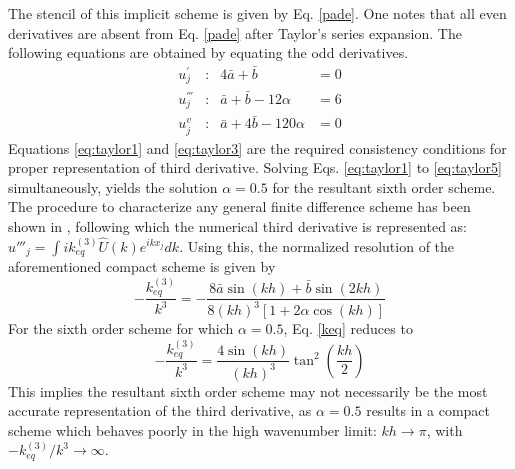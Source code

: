 The stencil of this implicit scheme is given by Eq. \eqref{pade}. One notes that all even derivatives are absent from Eq. \eqref{pade} after Taylor's series expansion. The following equations are obtained by 
equating the odd derivatives.
\begin{align}
\label{eq:taylor1}
u_{j}^{'}   &:&  4\bar{a} + \bar{b}&=0 \\
\label{eq:taylor3}
u_{j}^{'''} &:  & \bar{a} + \bar{b} - 12\alpha&=6\\
\label{eq:taylor5}
u_{j}^{v}   &:   &\bar{a} +4\bar{b} -120\alpha&=0
\end{align}
Equations \eqref{eq:taylor1} and \eqref{eq:taylor3} are the required consistency conditions for proper representation of third derivative. Solving Eqs. \eqref{eq:taylor1} to \eqref{eq:taylor5} simultaneously, yields the solution $\alpha = 0.5$ for the resultant sixth order scheme. The procedure to characterize any general finite difference scheme has been shown in \cite{Sengupta2003b}, following which the numerical third derivative is represented as: $u'''_j = \int ik_{eq}^{(3)}\hat{U}(k)e^{ikx_j}dk$. Using this, the normalized resolution of the aforementioned compact scheme is given by
\begin{equation}
\label{keq}
- \frac{k_{eq}^{(3)}}{k^3} = - \frac{8\bar{a} \sin(kh)+\bar{b}\sin(2kh)}{8(kh)^3[1+2\alpha\cos(kh)]}
\end{equation}
For the sixth order scheme for which $\alpha = 0.5$, Eq. \eqref{keq} reduces to
\begin{equation}
\label{keq1}
- \frac{k_{eq}^{(3)}}{k^3} = \frac{4\sin(kh)}{(kh)^3} \tan^2\left(\dfrac{kh}{2}\right)
\end{equation}
This implies the resultant sixth order scheme may not necessarily be the most accurate representation of the third derivative, as $\alpha = 0.5$ results in a compact scheme which behaves poorly in the high wavenumber limit: $kh\to\pi$, with $- {k_{eq}^{(3)}}/{k^3} \to \infty$.

